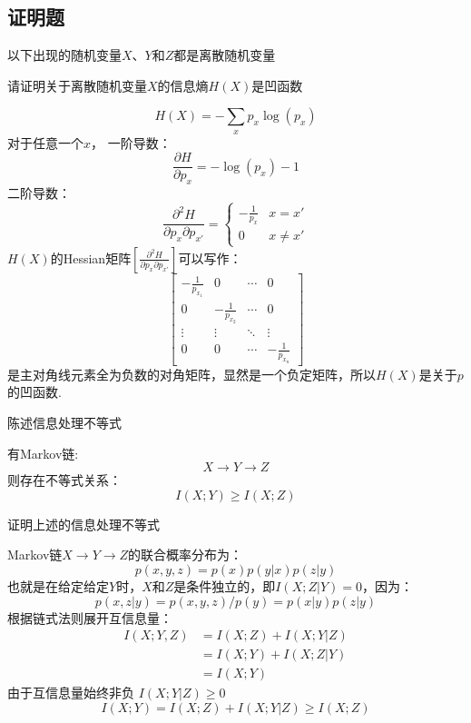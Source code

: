 \documentclass{exam}
\begin{document}
\begin{CJK*}{UTF8}{gbsn}
\newpage

\section*{证明题}
    以下出现的随机变量$X$、$Y$和$Z$都是离散随机变量
    \begin{questions}
    \question 请证明关于离散随机变量$X$的信息熵$H(X)$是凹函数
    \begin{solution}
    	\[H(X) = -\sum\limits_x {{p_x}} \log ({p_x})\]
    	对于任意一个$x$， 一阶导数：\[\frac{{\partial H}}{{\partial {p_x}}} =  - \log ({p_x}) - 1\]
    	二阶导数：
    	\begin{equation*}
    	\frac{{{\partial ^2}H}}{{\partial {p_x}\partial {p_{x'}}}} = 
    	\begin{cases}
    	  - \frac{1}{{{p_x}}}& x=x'\\
    	 0& x \ne x'
    	\end{cases}
    	\end{equation*}
    	$H(X)$的Hessian矩阵$\left[ {\frac{{{\partial ^2}H}}{{\partial {p_x}\partial {p_{x'}}}}} \right]$可以写作：
\[\left[ {\begin{array}{*{20}{c}}
	{ - \frac{1}{{{p_{{x_1}}}}}}&0& \cdots &0\\
	0&{ - \frac{1}{{{p_{{x_2}}}}}}& \cdots &0\\
	\vdots & \vdots & \ddots & \vdots \\
	0&0& \cdots &{ - \frac{1}{{{p_{{x_n}}}}}}
	\end{array}} \right]\]
    	是主对角线元素全为负数的对角矩阵，显然是一个负定矩阵，所以$H(X)$是关于$p$的凹函数.
    	\vspace{0.5cm}
    \end{solution}
    
    \question 陈述信息处理不等式
    \begin{solution}
    	\newline
    	有Markov链: $$X \to Y \to Z$$则存在不等式关系：
    	\[I(X;Y) \ge I(X;Z)\]
    \end{solution}
    
    \question 证明上述的信息处理不等式
    \begin{solution}
    \newline
    Markov链$X \to Y \to Z$的联合概率分布为：
    \[p(x,y,z) = p(x)p(y|x)p(z|y)\]
    也就是在给定给定$Y$时，$X$和$Z$是条件独立的，即$I(X;Z|Y) = 0$，因为：
    \[p(x,z|y) = p(x,y,z)/p(y) = p(x|y)p(z|y)\]
    根据链式法则展开互信息量：
        \begin{equation*}
        \begin{split}
        I(X;Y,Z) &= I(X;Z) + I(X;Y|Z)\\
        & = I(X;Y) + I(X;Z|Y)\\
        & = I(X;Y)
        \end{split}
        \end{equation*}
        由于互信息量始终非负 $ I(X;Y|Z) \ge 0$\\
        \[ I(X;Y) = I(X;Z) + I(X;Y|Z) \ge I(X;Z)\]
    \vspace{0.5cm}	
    \end{solution}
    

\end{questions}
\end{CJK*}
\end{document}
